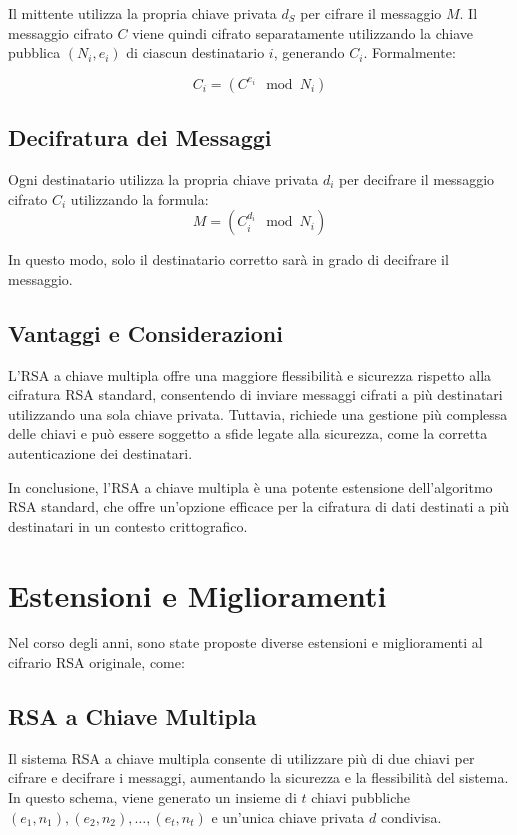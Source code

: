 \documentclass[a4paper,12pt]{report}
\begin{document}
Il mittente utilizza la propria chiave privata \( d_S \) per cifrare il messaggio \( M \). Il messaggio cifrato \( C \) viene quindi cifrato separatamente utilizzando la chiave pubblica \( (N_i, e_i) \) di ciascun destinatario \( i \), generando \( C_i \). Formalmente:

\[C_i = (C^{e_i} \mod N_i)\]

\subsection{Decifratura dei Messaggi}

Ogni destinatario utilizza la propria chiave privata \( d_i \) per decifrare il messaggio cifrato \( C_i \) utilizzando la formula:
\[M = (C_i^{d_i} \mod N_i)\]

In questo modo, solo il destinatario corretto sarà in grado di decifrare il messaggio.

\subsection{Vantaggi e Considerazioni}

L'RSA a chiave multipla offre una maggiore flessibilità e sicurezza rispetto alla cifratura RSA standard, consentendo di inviare messaggi cifrati a più destinatari utilizzando una sola chiave privata. Tuttavia, richiede una gestione più complessa delle chiavi e può essere soggetto a sfide legate alla sicurezza, come la corretta autenticazione dei destinatari.

In conclusione, l'RSA a chiave multipla è una potente estensione dell'algoritmo RSA standard, che offre un'opzione efficace per la cifratura di dati destinati a più destinatari in un contesto crittografico.

\section{Estensioni e Miglioramenti}
Nel corso degli anni, sono state proposte diverse estensioni e miglioramenti al cifrario RSA originale, come:

\subsection{RSA a Chiave Multipla}
Il sistema RSA a chiave multipla consente di utilizzare più di due chiavi per cifrare e decifrare i messaggi, aumentando la sicurezza e la flessibilità del sistema. In questo schema, viene generato un insieme di $t$ chiavi pubbliche $(e_1, n_1), (e_2, n_2), \ldots, (e_t, n_t)$ e un'unica chiave privata $d$ condivisa.
\end{document}
